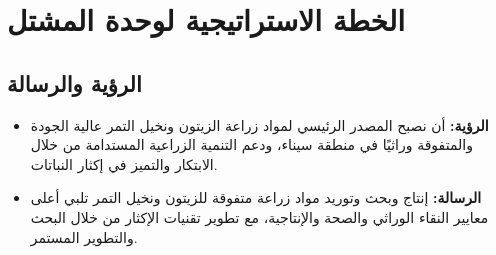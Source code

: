 \section{الخطة الاستراتيجية لوحدة المشتل}

\subsection{الرؤية والرسالة}
\begin{itemize}
    \item \textbf{الرؤية:} أن نصبح المصدر الرئيسي لمواد زراعة الزيتون ونخيل التمر عالية الجودة والمتفوقة وراثيًا في منطقة سيناء، ودعم التنمية الزراعية المستدامة من خلال الابتكار والتميز في إكثار النباتات.
    
    \item \textbf{الرسالة:} إنتاج وبحث وتوريد مواد زراعة متفوقة للزيتون ونخيل التمر تلبي أعلى معايير النقاء الوراثي والصحة والإنتاجية، مع تطوير تقنيات الإكثار من خلال البحث والتطوير المستمر.
\end{itemize}

